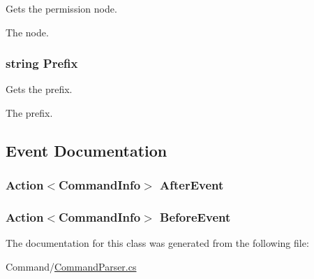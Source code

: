 Gets the permission node. 

The node.\hypertarget{classOTA_1_1Command_1_1CommandInfo_a0bf9d0add9f4a8c150513d661361598c}{}
\subsubsection[{Prefix}]{\setlength{\rightskip}{0pt plus 5cm}string Prefix\hspace{0.3cm}{\ttfamily [get]}}\label{classOTA_1_1Command_1_1CommandInfo_a0bf9d0add9f4a8c150513d661361598c}


Gets the prefix. 

The prefix.

\subsection{Event Documentation}
\hypertarget{classOTA_1_1Command_1_1CommandInfo_ab8ad1507610b5a9d460f412eb606cea8}{}
\subsubsection[{After\+Event}]{\setlength{\rightskip}{0pt plus 5cm}Action$<${\bf Command\+Info}$>$ After\+Event\hspace{0.3cm}{\ttfamily [package]}}\label{classOTA_1_1Command_1_1CommandInfo_ab8ad1507610b5a9d460f412eb606cea8}
\hypertarget{classOTA_1_1Command_1_1CommandInfo_abc05ff320f768663bcc90f0125e153cb}{}
\subsubsection[{Before\+Event}]{\setlength{\rightskip}{0pt plus 5cm}Action$<${\bf Command\+Info}$>$ Before\+Event\hspace{0.3cm}{\ttfamily [package]}}\label{classOTA_1_1Command_1_1CommandInfo_abc05ff320f768663bcc90f0125e153cb}


The documentation for this class was generated from the following file\+:\begin{DoxyCompactItemize}
\item 
Command/\hyperlink{CommandParser_8cs}{Command\+Parser.\+cs}\end{DoxyCompactItemize}

